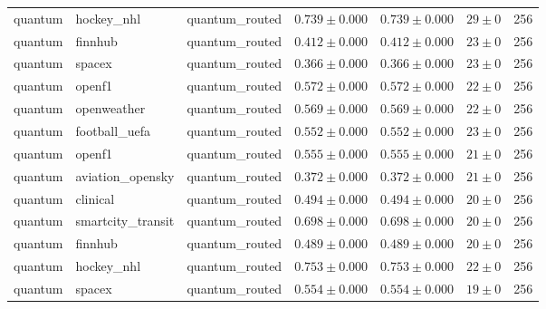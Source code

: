 \begin{table}[htbp]
\begin{tabular}{l l l r r r r}
quantum & hockey\_nhl & quantum\_routed & $0.739\pm0.000$ & $0.739\pm0.000$ & $29\pm0$ & 256 \\
quantum & finnhub & quantum\_routed & $0.412\pm0.000$ & $0.412\pm0.000$ & $23\pm0$ & 256 \\
quantum & spacex & quantum\_routed & $0.366\pm0.000$ & $0.366\pm0.000$ & $23\pm0$ & 256 \\
quantum & openf1 & quantum\_routed & $0.572\pm0.000$ & $0.572\pm0.000$ & $22\pm0$ & 256 \\
quantum & openweather & quantum\_routed & $0.569\pm0.000$ & $0.569\pm0.000$ & $22\pm0$ & 256 \\
quantum & football\_uefa & quantum\_routed & $0.552\pm0.000$ & $0.552\pm0.000$ & $23\pm0$ & 256 \\
quantum & openf1 & quantum\_routed & $0.555\pm0.000$ & $0.555\pm0.000$ & $21\pm0$ & 256 \\
quantum & aviation\_opensky & quantum\_routed & $0.372\pm0.000$ & $0.372\pm0.000$ & $21\pm0$ & 256 \\
quantum & clinical & quantum\_routed & $0.494\pm0.000$ & $0.494\pm0.000$ & $20\pm0$ & 256 \\
quantum & smartcity\_transit & quantum\_routed & $0.698\pm0.000$ & $0.698\pm0.000$ & $20\pm0$ & 256 \\
quantum & finnhub & quantum\_routed & $0.489\pm0.000$ & $0.489\pm0.000$ & $20\pm0$ & 256 \\
quantum & hockey\_nhl & quantum\_routed & $0.753\pm0.000$ & $0.753\pm0.000$ & $22\pm0$ & 256 \\
quantum & spacex & quantum\_routed & $0.554\pm0.000$ & $0.554\pm0.000$ & $19\pm0$ & 256 \\
\hline
\end{tabular}
\end{table}
